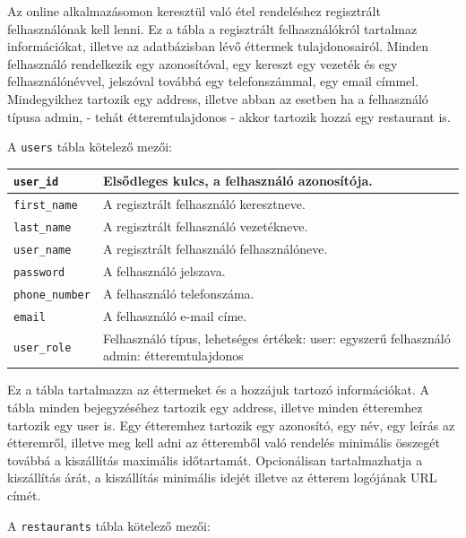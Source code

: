 
Az online alkalmazásomon keresztül való étel rendeléshez regisztrált felhasználónak kell lenni. Ez a tábla a regisztrált felhasználókról tartalmaz információkat, illetve az adatbázisban lévő éttermek tulajdonosairól. Minden felhasználó rendelkezik egy azonosítóval, egy kereszt egy vezeték és egy felhasználónévvel, jelszóval továbbá egy telefonszámmal, egy email címmel. Mindegyikhez tartozik egy address, illetve abban az esetben ha a felhasználó típusa admin, - tehát étteremtulajdonos - akkor tartozik hozzá egy restaurant is.

\newpage

\noindent A \texttt{users} tábla kötelező mezői:

\bigskip

\begin{tabular}{|p{3cm}|p{10cm}|}
\hline
\texttt{user\_id} & Elsődleges kulcs, a felhasználó azonosítója. \\
\hline
\texttt{first\_name} & A regisztrált felhasználó keresztneve. \\
\hline
\texttt{last\_name} & A regisztrált felhasználó vezetékneve. \\
\hline
\texttt{user\_name} & A regisztrált felhasználó felhasználóneve. \\
\hline
\texttt{password} & A felhasználó jelszava. \\
\hline
\texttt{phone\_number} & A felhasználó telefonszáma. \\
\hline
\texttt{email} & A felhasználó e-mail címe. \\
\hline
\texttt{user\_role} & Felhasználó típus, lehetséges értékek: user: egyszerű felhasználó admin: étteremtulajdonos \\
\hline
\end{tabular}


Ez a tábla tartalmazza az éttermeket és a hozzájuk tartozó információkat. A tábla minden bejegyzéséhez tartozik egy address, illetve minden étteremhez tartozik egy user is. Egy étteremhez tartozik egy azonosító, egy név, egy leírás az étteremről, illetve meg kell adni az étteremből való rendelés minimális összegét továbbá a kiszállítás maximális időtartamát. Opcionálisan tartalmazhatja a kiszállítás árát, a kiszállítás minimális idejét illetve az étterem logójának URL címét.

\bigskip

\noindent A \texttt{restaurants} tábla kötelező mezői:

